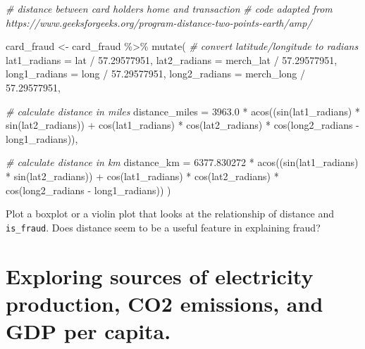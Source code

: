 \documentclass[
]{article}
\newenvironment{Shaded}{\begin{snugshade}}{\end{snugshade}}
\newcommand{\AttributeTok}[1]{\textcolor[rgb]{0.77,0.63,0.00}{#1}}
\newcommand{\CommentTok}[1]{\textcolor[rgb]{0.56,0.35,0.01}{\textit{#1}}}
\newcommand{\FloatTok}[1]{\textcolor[rgb]{0.00,0.00,0.81}{#1}}
\newcommand{\FunctionTok}[1]{\textcolor[rgb]{0.00,0.00,0.00}{#1}}
\newcommand{\NormalTok}[1]{#1}
\newcommand{\OtherTok}[1]{\textcolor[rgb]{0.56,0.35,0.01}{#1}}
\newcommand{\SpecialCharTok}[1]{\textcolor[rgb]{0.00,0.00,0.00}{#1}}
\begin{document}
\begin{Shaded}
\begin{Highlighting}[]
\CommentTok{\# distance between card holder\textquotesingle{}s home and transaction}
\CommentTok{\# code adapted from https://www.geeksforgeeks.org/program{-}distance{-}two{-}points{-}earth/amp/}


\NormalTok{card\_fraud }\OtherTok{\textless{}{-}}\NormalTok{ card\_fraud }\SpecialCharTok{\%\textgreater{}\%}
  \FunctionTok{mutate}\NormalTok{(}
        \CommentTok{\# convert latitude/longitude to radians}
    \AttributeTok{lat1\_radians =}\NormalTok{ lat }\SpecialCharTok{/} \FloatTok{57.29577951}\NormalTok{,}
    \AttributeTok{lat2\_radians =}\NormalTok{ merch\_lat }\SpecialCharTok{/} \FloatTok{57.29577951}\NormalTok{,}
    \AttributeTok{long1\_radians =}\NormalTok{ long }\SpecialCharTok{/} \FloatTok{57.29577951}\NormalTok{,}
    \AttributeTok{long2\_radians =}\NormalTok{ merch\_long }\SpecialCharTok{/} \FloatTok{57.29577951}\NormalTok{,}
    
    \CommentTok{\# calculate distance in miles}
    \AttributeTok{distance\_miles =} \FloatTok{3963.0} \SpecialCharTok{*} \FunctionTok{acos}\NormalTok{((}\FunctionTok{sin}\NormalTok{(lat1\_radians) }\SpecialCharTok{*} \FunctionTok{sin}\NormalTok{(lat2\_radians)) }\SpecialCharTok{+} \FunctionTok{cos}\NormalTok{(lat1\_radians) }\SpecialCharTok{*} \FunctionTok{cos}\NormalTok{(lat2\_radians) }\SpecialCharTok{*} \FunctionTok{cos}\NormalTok{(long2\_radians }\SpecialCharTok{{-}}\NormalTok{ long1\_radians)),}

    \CommentTok{\# calculate distance in km}
    \AttributeTok{distance\_km =} \FloatTok{6377.830272} \SpecialCharTok{*} \FunctionTok{acos}\NormalTok{((}\FunctionTok{sin}\NormalTok{(lat1\_radians) }\SpecialCharTok{*} \FunctionTok{sin}\NormalTok{(lat2\_radians)) }\SpecialCharTok{+} \FunctionTok{cos}\NormalTok{(lat1\_radians) }\SpecialCharTok{*} \FunctionTok{cos}\NormalTok{(lat2\_radians) }\SpecialCharTok{*} \FunctionTok{cos}\NormalTok{(long2\_radians }\SpecialCharTok{{-}}\NormalTok{ long1\_radians))}
\NormalTok{  )}
\end{Highlighting}
\end{Shaded}

Plot a boxplot or a violin plot that looks at the relationship of
distance and \texttt{is\_fraud}. Does distance seem to be a useful
feature in explaining fraud?

\hypertarget{exploring-sources-of-electricity-production-co2-emissions-and-gdp-per-capita.}{%
\section{Exploring sources of electricity production, CO2 emissions, and
GDP per
capita.}\label{exploring-sources-of-electricity-production-co2-emissions-and-gdp-per-capita.}}
\end{document}
